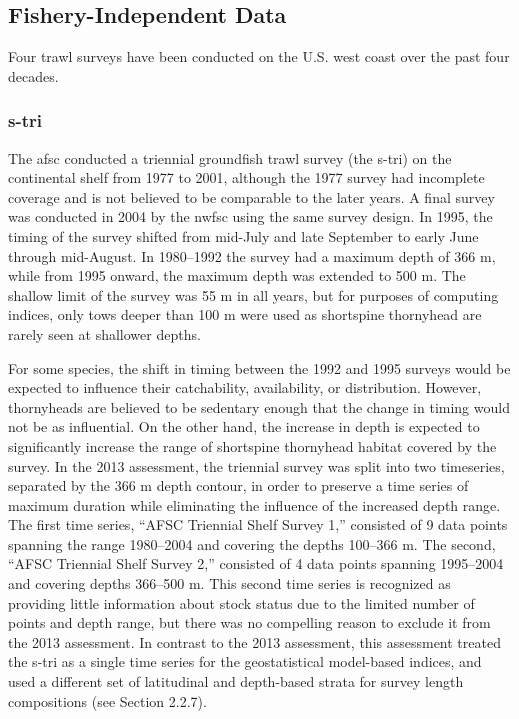 \documentclass[11pt,
  english,
  letterpaper,
]{article}
\begin{document}
\hypertarget{fishery-independent-data}{%
\subsection{Fishery-Independent Data}\label{fishery-independent-data}}

Four trawl surveys have been conducted on the U.S. west coast over the past four decades.

\hypertarget{section}{%
\subsubsection{\texorpdfstring{\acrlong{s-tri}}{}}\label{section}}

The \gls{afsc} conducted a triennial groundfish trawl survey (the \Gls{s-tri}) on the continental shelf from 1977 to 2001, although the 1977 survey had incomplete coverage and is not believed to be comparable to the later years. A final survey was conducted in 2004 by the \gls{nwfsc} using the same survey design. In 1995, the timing of the survey shifted from mid-July and late September to early June through mid-August. In 1980--1992 the survey had a maximum depth of 366 m, while from 1995 onward, the maximum depth was extended to 500 m. The shallow limit of the survey was 55 m in all years, but for purposes of computing indices, only tows deeper than 100 m were used as shortspine thornyhead are rarely seen at shallower depths.

For some species, the shift in timing between the 1992 and 1995 surveys would be expected to influence their catchability, availability, or distribution. However, thornyheads are believed to be sedentary enough that the change in timing would not be as influential. On the other hand, the increase in depth is expected to significantly increase the range of shortspine thornyhead habitat covered by the survey. In the 2013 assessment, the triennial survey was split into two timeseries, separated by the 366 m depth contour, in order to preserve a time series of maximum duration while eliminating the influence of the increased depth range. The first time series, ``AFSC Triennial Shelf Survey 1,'' consisted of 9 data points spanning the range 1980--2004 and covering the depths 100--366 m. The second, ``AFSC Triennial Shelf Survey 2,'' consisted of 4 data points spanning 1995--2004 and covering depths 366--500 m. This second time series is recognized as providing little information about stock status due to the limited number of points and depth range, but there was no compelling reason to exclude it from the 2013 assessment. In contrast to the 2013 assessment, this assessment treated the \gls{s-tri} as a single time series for the geostatistical model-based indices, and used a different set of latitudinal and depth-based strata for survey length compositions (see Section 2.2.7).
\end{document}
